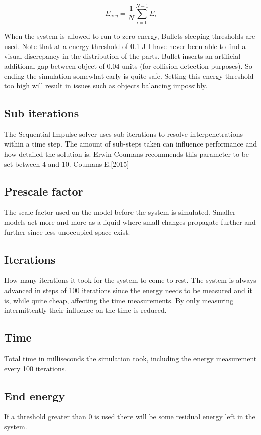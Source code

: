 \begin{equation}
E_{avg} = \frac{1}{N}\sum_{i=0}^{N-1}E_i
\end{equation}

When the system is allowed to run to zero energy, Bullets sleeping thresholds are
used. Note that at a energy threshold of 0.1 J I have never been able
to find a visual discrepancy in the distribution of the parts. Bullet inserts an
artificial additional gap between object of 0.04 units (for collision detection purposes).
So ending the simulation somewhat early is quite safe. Setting this energy threshold
too high will result in issues such as objects balancing impossibly.

\subsection{Sub iterations}
The Sequential Impulse solver uses sub-iterations to resolve interpenetrations within
a time step. The amount of sub-steps taken can influence performance and how detailed
the solution is. Erwin Coumans recommends this parameter to be set between 4 and 10. Coumans E.[2015]

\subsection{Prescale factor}
The scale factor used on the model before the system is simulated.
Smaller models act more and more as a liquid where small changes propagate further
and further since less unoccupied space exist.

\subsection{Iterations}
How many iterations it took for the system to come to rest. The system is always
advanced in steps of 100 iterations since the energy needs to be measured and it
is, while quite cheap, affecting the time measurements. By only measuring intermittently
their influence on the time is reduced.

\subsection{Time}
Total time in milliseconds the simulation took, including the energy measurement
every 100 iterations.

\subsection{End energy}\label{subsec:enden}
If a threshold greater than 0 is used there will be some residual energy left in the
system.

